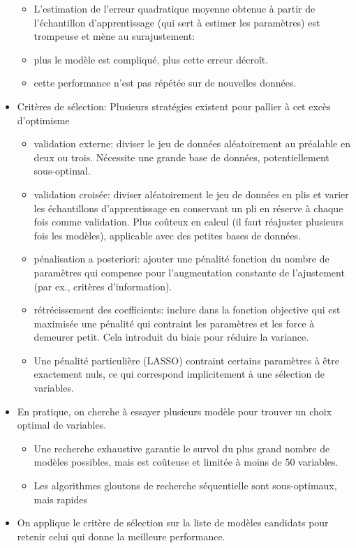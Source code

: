 \documentclass[
  11pt,
  letterpaper,
]{scrbook}
\providecommand{\tightlist}{%
  \setlength{\itemsep}{0pt}\setlength{\parskip}{0pt}}\usepackage{longtable,booktabs,array}
\theoremstyle{definition}
\theoremstyle{remark}
\begin{document}
\begin{tcolorbox}
\begin{itemize}
  \begin{itemize}
  \tightlist
  \item
    L'estimation de l'erreur quadratique moyenne obtenue à partir de
    l'échantillon d'apprentissage (qui sert à estimer les paramètres)
    est trompeuse et mène au surajustement:
  \item
    plus le modèle est compliqué, plus cette erreur décroît.
  \item
    cette performance n'est pas répétée sur de nouvelles données.
  \end{itemize}
\item
  Critères de sélection: Plusieurs stratégies existent pour pallier à
  cet excès d'optimisme

  \begin{itemize}
  \tightlist
  \item
    validation externe: diviser le jeu de données aléatoirement au
    préalable en deux ou trois. Nécessite une grande base de données,
    potentiellement sous-optimal.
  \item
    validation croisée: diviser aléatoirement le jeu de données en plis
    et varier les échantillons d'apprentissage en conservant un pli en
    réserve à chaque fois comme validation. Plus coûteux en calcul (il
    faut réajuster plusieurs fois les modèles), applicable avec des
    petites bases de données.
  \item
    pénalisation a posteriori: ajouter une pénalité fonction du nombre
    de paramètres qui compense pour l'augmentation constante de
    l'ajustement (par ex., critères d'information).
  \item
    rétrécissement des coefficients: inclure dans la fonction objective
    qui est maximisée une pénalité qui contraint les paramètres et les
    force à demeurer petit. Cela introduit du biais pour réduire la
    variance.
  \item
    Une pénalité particulière (LASSO) contraint certains paramètres à
    être exactement nuls, ce qui correspond implicitement à une
    sélection de variables.
  \end{itemize}
\item
  En pratique, on cherche à essayer plusieurs modèle pour trouver un
  choix optimal de variables.

  \begin{itemize}
  \tightlist
  \item
    Une recherche exhaustive garantie le survol du plus grand nombre de
    modèles possibles, mais est coûteuse et limitée à moins de 50
    variables.
  \item
    Les algorithmes gloutons de recherche séquentielle sont
    sous-optimaux, mais rapides
  \end{itemize}
\item
  On applique le critère de sélection sur la liste de modèles candidats
  pour retenir celui qui donne la meilleure performance.
\end{itemize}

\end{tcolorbox}
\end{document}

